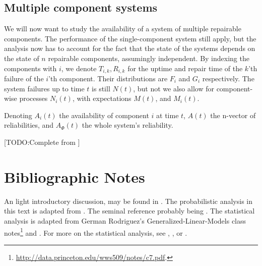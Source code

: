 \subsection{Multiple component systems}
We will now want to study the availability of a system of multiple repairable components.
The performance of the single-component system still apply, but the analysis now has to account for the fact that the state of the systems depends on the state of $n$ repairable components, assumingly independent.
By indexing the components with $i$, we denote $T_{i,k}, R_{i,k}$ for the uptime and repair time of the $k$'th failure of the $i$'th component. Their distributions are $F_i$ and $G_i$ respectively.
The system failures up to time $t$ is still $N(t)$, but not we also allow for component-wise processes $N_i(t)$, with expectations $M(t)$, and $M_i(t)$.

Denoting $A_i(t)$ the availability of component $i$ at time $t$, $A(t)$ the n-vector of reliabilities, and $A_\Phi(t)$ the whole system's reliability. 

[TODO:Complete from  \cite[Sec.4.3]{aven_stochastic_1999}]



\section{Bibliographic Notes}
An light introductory discussion, may be found in \cite{nahmias_production_2015}. 
The probabilistic analysis in this text is adapted from \cite{aven_stochastic_1999}.
The seminal reference probably being \cite{barlow_mathematical_1965}.
The statistical analysis is adapted from German Rodriguez's Generalized-Linear-Models class notes\footnote{\url{http://data.princeton.edu/wws509/notes/c7.pdf}.} and \cite[Ch.8]{natrella_nist/sematech_2010}.
For more on the statistical analysis, see \cite{cox_analysis_1984}, \cite{kalbfleisch_statistical_2002}, or \cite{klein_survival_2005}.


% 